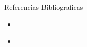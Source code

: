\documentclass[10pt,letterpaper,final]{article}
\begin{document}
Referencias Bibliograficas


\begin{itemize}
   \item \cite{bachute2021autonomous}
   \item \cite{cai2021vision}
   
\end{itemize}

\nocite{*}


\end{document}
